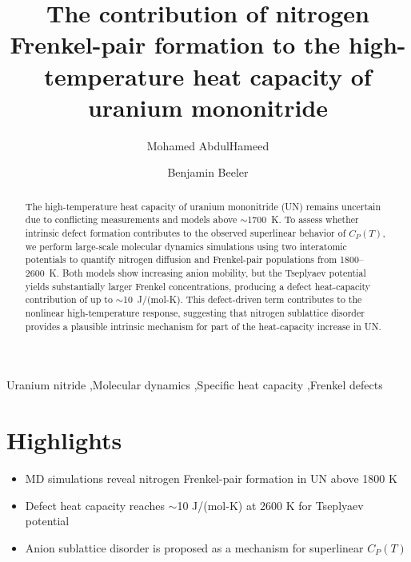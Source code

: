 \documentclass[preprint,12pt,sort&compress]{elsarticle}
\newcommand{\?}{\stackrel{?}{=}}
\begin{document}
\begin{frontmatter}

\title{The contribution of nitrogen Frenkel-pair formation to the high-temperature heat capacity of uranium mononitride}

\author[ncsu,unsw]{Mohamed AbdulHameed}
\author[ncsu,inl]{Benjamin Beeler}

\address[ncsu]{Department of Nuclear Engineering, North Carolina State University, Raleigh, NC 27695, USA}
\address[inl]{Idaho National Laboratory, Idaho Falls, ID 83415, USA}
\address[unsw]{School of Mechanical and Manufacturing Engineering, UNSW Sydney, Sydney, NSW 2052, Australia}

\begin{abstract}

The high-temperature heat capacity of uranium mononitride (UN) remains uncertain due to conflicting measurements and models above $\sim$1700~K. To assess whether intrinsic defect formation contributes to the observed superlinear behavior of $C_P(T)$, we perform large-scale molecular dynamics simulations using two interatomic potentials to quantify nitrogen diffusion and Frenkel-pair populations from 1800--2600~K. Both models show increasing anion mobility, but the Tseplyaev potential yields substantially larger Frenkel concentrations, producing a defect heat-capacity contribution of up to $\sim$10~J/(mol-K). This defect-driven term contributes to the nonlinear high-temperature response, suggesting that nitrogen sublattice disorder provides a plausible intrinsic mechanism for part of the heat-capacity increase in UN.

\end{abstract}

\begin{keyword}
Uranium nitride \sep Molecular dynamics \sep Specific heat capacity \sep Frenkel defects
\end{keyword}

\end{frontmatter}

\newpage

\section*{Highlights}
\begin{itemize}

\item MD simulations reveal nitrogen Frenkel-pair formation in UN above 1800 K
\item Defect heat capacity reaches $\sim$10 J/(mol-K) at 2600 K for Tseplyaev potential
\item Anion sublattice disorder is proposed as a mechanism for superlinear $C_P(T)$

\end{itemize}
\end{document}
